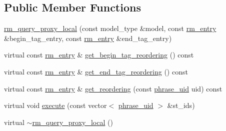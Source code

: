 \subsection*{Public Member Functions}
\begin{DoxyCompactItemize}
\item 
\hyperlink{classuva_1_1smt_1_1bpbd_1_1server_1_1rm_1_1proxy_1_1rm__query__proxy__local_a64bf130268d2b56f3a69a73ad3570da1}{rm\+\_\+query\+\_\+proxy\+\_\+local} (const model\+\_\+type \&model, const \hyperlink{namespaceuva_1_1smt_1_1bpbd_1_1server_1_1rm_1_1models_a67353bb21590b2a2adf05500899439ed}{rm\+\_\+entry} \&begin\+\_\+tag\+\_\+entry, const \hyperlink{namespaceuva_1_1smt_1_1bpbd_1_1server_1_1rm_1_1models_a67353bb21590b2a2adf05500899439ed}{rm\+\_\+entry} \&end\+\_\+tag\+\_\+entry)
\item 
virtual const \hyperlink{namespaceuva_1_1smt_1_1bpbd_1_1server_1_1rm_1_1models_a67353bb21590b2a2adf05500899439ed}{rm\+\_\+entry} \& \hyperlink{classuva_1_1smt_1_1bpbd_1_1server_1_1rm_1_1proxy_1_1rm__query__proxy__local_a13070717ccd372ad22d87b5e49f1e482}{get\+\_\+begin\+\_\+tag\+\_\+reordering} () const 
\item 
virtual const \hyperlink{namespaceuva_1_1smt_1_1bpbd_1_1server_1_1rm_1_1models_a67353bb21590b2a2adf05500899439ed}{rm\+\_\+entry} \& \hyperlink{classuva_1_1smt_1_1bpbd_1_1server_1_1rm_1_1proxy_1_1rm__query__proxy__local_a4a77382961280708b20004e1469fb81f}{get\+\_\+end\+\_\+tag\+\_\+reordering} () const 
\item 
virtual const \hyperlink{namespaceuva_1_1smt_1_1bpbd_1_1server_1_1rm_1_1models_a67353bb21590b2a2adf05500899439ed}{rm\+\_\+entry} \& \hyperlink{classuva_1_1smt_1_1bpbd_1_1server_1_1rm_1_1proxy_1_1rm__query__proxy__local_a5f159493c0a0b9281b8bafb360bfd036}{get\+\_\+reordering} (const \hyperlink{namespaceuva_1_1smt_1_1bpbd_1_1server_ad18d4cdf5504e76c22b0c124ff60b44f}{phrase\+\_\+uid} uid) const 
\item 
virtual void \hyperlink{classuva_1_1smt_1_1bpbd_1_1server_1_1rm_1_1proxy_1_1rm__query__proxy__local_a3ca0054cf1bc862bc213ee9be473e213}{execute} (const vector$<$ \hyperlink{namespaceuva_1_1smt_1_1bpbd_1_1server_ad18d4cdf5504e76c22b0c124ff60b44f}{phrase\+\_\+uid} $>$ \&st\+\_\+ids)
\item 
virtual \hyperlink{classuva_1_1smt_1_1bpbd_1_1server_1_1rm_1_1proxy_1_1rm__query__proxy__local_ad21007eaea76e319e7fdcf11ed7df258}{$\sim$rm\+\_\+query\+\_\+proxy\+\_\+local} ()
\end{DoxyCompactItemize}


